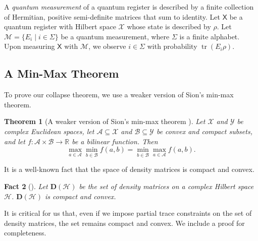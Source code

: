 \documentclass[11pt]{article}
\newtheorem{theorem}{Theorem}[section]
\newtheorem{fact}[theorem]{Fact}
\theoremstyle{definition}
\DeclareMathOperator{\tr}{tr}
\newcommand{\reals}{\mathbb R}
\newcommand{\calA}{\mathcal{A}}
\newcommand{\calB}{\mathcal{B}}
\newcommand{\calH}{\mathcal{H}}
\newcommand{\calM}{\mathcal{M}}
\newcommand{\calX}{\mathcal{X}}
\newcommand{\calY}{\mathcal{Y}}
\newcommand{\qreg}[1]{\mathsf{#1}}
\begin{document}
A \textit{quantum measurement} of a quantum register is described by a finite collection of Hermitian, positive semi-definite matrices that sum to identity. Let $\qreg{X}$ be a quantum register with Hilbert space $\calX$ whose state is described by $\rho$. Let $\calM = \{E_i \mid i \in \Sigma\}$ be a quantum measurement, where $\Sigma$ is a finite alphabet. Upon measuring $\qreg{X}$ with $\calM$, we observe $i \in \Sigma$ with probability $\tr(E_i \rho)$. 

\subsection{A Min-Max Theorem}
To prove our collapse theorem, we use a weaker version of Sion's min-max theorem. 

\begin{theorem}[A weaker version of Sion's min-max theorem \cite{sion1958general}]\label{fact:min-max}
Let $\calX$ and $\calY$ be complex Euclidean spaces, let $\calA \subseteq \calX$ and $\calB \subseteq \calY$ be convex and compact subsets, and let $f: \calA \times \calB \to \reals$ be a bilinear function. Then 
\[
\max_{a \in \calA} \min_{b \in \calB} f(a, b) = \min_{b \in \calB} \max_{a \in \calA} f(a,b).
\]
\end{theorem}

It is a well-known fact that the space of density matrices is compact and convex.
\begin{fact}[{\cite[Chapter 1]{watrous2018theory}}]\label{fact:density-matrices-compact-convex}
Let $\mathbf{D}(\calH)$ be the set of density matrices on a complex Hilbert space $\calH$. $\mathbf{D}(\calH)$ is compact and convex.
\end{fact}

It is critical for us that, even if we impose partial trace constraints on the set of density matrices, the set remains compact and convex. We include a proof for completeness.
\end{document}
